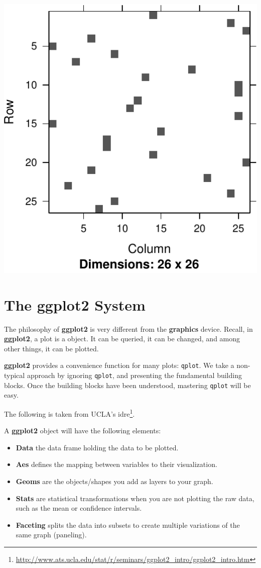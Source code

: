 \documentclass[]{book}
\providecommand{\tightlist}{%
  \setlength{\itemsep}{0pt}\setlength{\parskip}{0pt}}
\renewcommand{\href}[2]{#2\footnote{\url{#1}}}
\theoremstyle{definition}
\theoremstyle{definition}
\theoremstyle{definition}
\theoremstyle{remark}
\begin{document}
\includegraphics[width=0.5\linewidth]{Rcourse_files/figure-latex/unnamed-chunk-272-1}

\hypertarget{the-ggplot2-system}{%
\section{The ggplot2 System}\label{the-ggplot2-system}}

The philosophy of \textbf{ggplot2} is very different from the \textbf{graphics} device.
Recall, in \textbf{ggplot2}, a plot is a object.
It can be queried, it can be changed, and among other things, it can be plotted.

\textbf{ggplot2} provides a convenience function for many plots: \texttt{qplot}.
We take a non-typical approach by ignoring \texttt{qplot}, and presenting the fundamental building blocks.
Once the building blocks have been understood, mastering \texttt{qplot} will be easy.

The following is taken from \href{http://www.ats.ucla.edu/stat/r/seminars/ggplot2_intro/ggplot2_intro.htm}{UCLA's idre}.

A \textbf{ggplot2} object will have the following elements:

\begin{itemize}
\tightlist
\item
  \textbf{Data} the data frame holding the data to be plotted.
\item
  \textbf{Aes} defines the mapping between variables to their visualization.
\item
  \textbf{Geoms} are the objects/shapes you add as layers to your graph.
\item
  \textbf{Stats} are statistical transformations when you are not plotting the raw data, such as the mean or confidence intervals.
\item
  \textbf{Faceting} splits the data into subsets to create multiple variations of the same graph (paneling).
\end{itemize}
\end{document}
